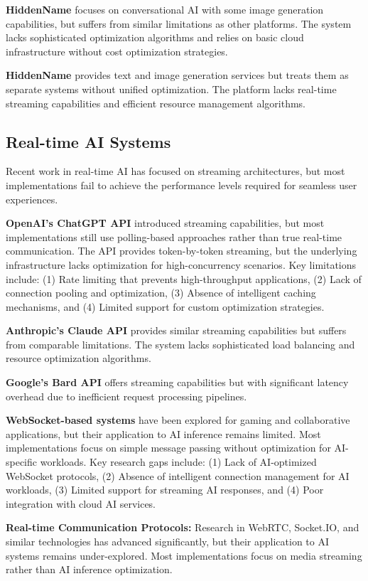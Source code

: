 \documentclass[conference]{IEEEtran}
\begin{document}
\textbf{HiddenName} focuses on conversational AI with some image generation capabilities, but suffers from similar limitations as other platforms. The system lacks sophisticated optimization algorithms and relies on basic cloud infrastructure without cost optimization strategies.

\textbf{HiddenName} provides text and image generation services but treats them as separate systems without unified optimization. The platform lacks real-time streaming capabilities and efficient resource management algorithms.

\subsection{Real-time AI Systems}
Recent work in real-time AI has focused on streaming architectures, but most implementations fail to achieve the performance levels required for seamless user experiences.

\textbf{OpenAI's ChatGPT API} introduced streaming capabilities, but most implementations still use polling-based approaches rather than true real-time communication. The API provides token-by-token streaming, but the underlying infrastructure lacks optimization for high-concurrency scenarios. Key limitations include: (1) Rate limiting that prevents high-throughput applications, (2) Lack of connection pooling and optimization, (3) Absence of intelligent caching mechanisms, and (4) Limited support for custom optimization strategies.

\textbf{Anthropic's Claude API} provides similar streaming capabilities but suffers from comparable limitations. The system lacks sophisticated load balancing and resource optimization algorithms.

\textbf{Google's Bard API} offers streaming capabilities but with significant latency overhead due to inefficient request processing pipelines.

\textbf{WebSocket-based systems} have been explored for gaming and collaborative applications, but their application to AI inference remains limited. Most implementations focus on simple message passing without optimization for AI-specific workloads. Key research gaps include: (1) Lack of AI-optimized WebSocket protocols, (2) Absence of intelligent connection management for AI workloads, (3) Limited support for streaming AI responses, and (4) Poor integration with cloud AI services.

\textbf{Real-time Communication Protocols:} Research in WebRTC, Socket.IO, and similar technologies has advanced significantly, but their application to AI systems remains under-explored. Most implementations focus on media streaming rather than AI inference optimization.
\end{document}
